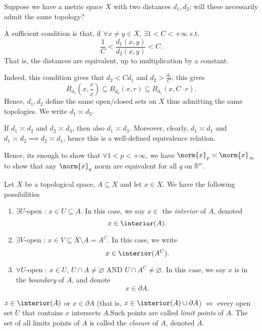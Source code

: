 \begin{definition}
    Suppose we have a metric space $X$ with two distances $d_1, d_2$; will these necessarily admit the same topology?

     A sufficient condition is that, if $\forall x \neq y \in X$, $\exists 1 < C < +\infty$ s.t. $$\frac{1}{C} < \frac{d_1(x, y)}{d_2(x,y)} < C.$$ That is, the distances are equivalent, up to multiplication by a constant.

    Indeed, this condition gives that $d_2 < C d_1$ and $d_2 > \frac{d_1}{C}$; this gives $$B_{d_1}(x, \frac{r}{c}) \subseteq B_{d_2}(x, r) \subseteq B_{d_1}(x, C \cdot r).$$ Hence, $d_1, d_2$ define the same open/closed sets on $X$ thus admitting the same topologies. We write $d_1 \asymp d_2$.
\end{definition}

\begin{remark}
    If $d_1 \asymp d_2$ and $d_2\asymp d_3$, then also $d_1 \asymp d_3$. Moreover, clearly, $d_1 \asymp d_1$ and $d_1 \asymp d_2 \implies d_2 \asymp d_1$, hence this is a well-defined equivalence relation.

    Hence, its enough to show that $\forall 1 < p < +\infty$, we have $\norm{x}_p \asymp \norm{x}_\infty$ to show that any $\norm{x}_q$ norm are equivalent for all $q$ on $\mathbb{R}^n$.
\end{remark}

\begin{definition}
Let $X$ be a topological space, $A \subseteq X$ and let $x \in X$. We have the following possibilities
\begin{enumerate}
    \item $\exists U$-open : $x \in U \subseteq A$. In this case, we say $x \in $ the \emph{interior} of $A$, denoted \[
    x \in \interior (A).
    \]
    \item $\exists V$-open : $x \in V \subseteq X\setminus A = A^C$. In this case, we write \[
    x \in \interior (A^C).    
    \]
    \item $\forall U$-open : $x \in U$, $U \cap A \neq \varnothing$ AND $U \cap A^C \neq \varnothing$. In this case, we say $x$ is in the \emph{boundary} of $A$, and denote \[
    x \in \partial A.    
    \]
\end{enumerate}
\end{definition}

\begin{definition}[Closure]
    $x \in \interior (A)$ or $x \in \partial A$ (that is, $x \in \interior (A) \cup \partial A$) $\iff $ every open set $U$ that contains $x$ intersects $A$.\footnotemark Such points are called \emph{limit points} of $A$. The set of all limits points of $A$ is called the \emph{closure} of $A$, denoted \(
    \overline{A}.
    \)
\end{definition}

